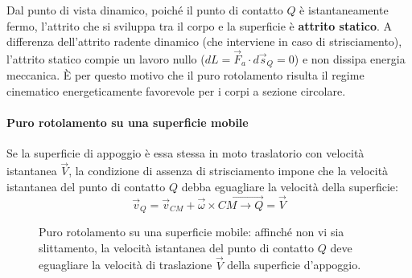 Dal punto di vista dinamico, poiché il punto di contatto $Q$ è istantaneamente fermo, l'attrito che si sviluppa tra il corpo e la superficie è \textbf{attrito statico}. A differenza dell'attrito radente dinamico (che interviene in caso di strisciamento), l'attrito statico compie un lavoro nullo ($dL = \vec{F}_a \cdot d\vec{s}_Q = 0$) e non dissipa energia meccanica. È per questo motivo che il puro rotolamento risulta il regime cinematico energeticamente favorevole per i corpi a sezione circolare.

\paragraph{Puro rotolamento su una superficie mobile}
Se la superficie di appoggio è essa stessa in moto traslatorio con velocità istantanea $\vec{V}$, la condizione di assenza di strisciamento impone che la velocità istantanea del punto di contatto $Q$ debba eguagliare la velocità della superficie:
\begin{equation}
    \vec{v}_Q = \vec{v}_{CM} + \vec{\omega} \times \overrightarrow{CM \to Q} = \vec{V}
\end{equation}

\begin{figure}[ht]
    \centering
    \caption{Puro rotolamento su una superficie mobile: affinché non vi sia slittamento, la velocità istantanea del punto di contatto $Q$ deve eguagliare la velocità di traslazione $\vec{V}$ della superficie d'appoggio.}
\end{figure}

